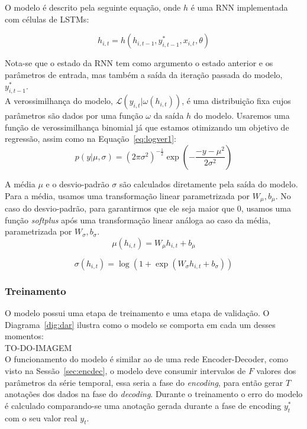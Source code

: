 O modelo é descrito pela seguinte equação, onde $h$ é uma RNN implementada com células de LSTMs:

\[
h_{i,t} = h(h_{i,t-1},y^*_{i,t-1},x_{i,t}, \theta)
\]

Nota-se que o estado da RNN tem como argumento o estado anterior e os parâmetros de entrada, mas também a saída da iteração passada do modelo, $y^*_{i,t-1}$. \\

A verossimilhança do modelo, $\mathcal{L}(y_{i,t} | \omega(h_{i,t}))$, é uma distribuição fixa cujos parâmetros são dados por uma função $\omega$ da saída $h$ do modelo. Usaremos uma função de verossimilhança binomial já que estamos otimizando um objetivo de regressão, assim como na Equação~\ref{eq:logver1}:
\[
  p(y | \mu,\sigma) = {(2\pi\sigma^2)}^{-\frac{1}{2}} \exp(-  \frac{-y - \mu^2}{2\sigma^2})  
\]

A média $\mu$ e o desvio-padrão $\sigma$ são calculados diretamente pela saída do modelo. Para a média, usamos uma transformação linear parametrizada por $W_{\mu},b_{\mu}$. No caso do desvio-padrão, para garantirmos que ele seja maior que 0, usamos uma função \textit{softplus} após uma transformação linear análoga ao caso da média, parametrizada por  $W_{\sigma},b_{\sigma}$.\\

\[ \mu(h_{i,t}) = W_{\mu}h_{i,t} + b_{\mu} \]

\[ \sigma(h_{i,t}) = \log(1 + \exp(W_{\sigma}h_{i,t}+ b_{\sigma})) \]


\subsubsection{Treinamento}



O modelo possui uma etapa de treinamento e uma etapa de validação. O Diagrama~\ref{dig:dar} ilustra como o modelo se comporta em cada um desses momentos: \\


TO-DO-IMAGEM \\


O funcionamento do modelo é similar ao de uma rede Encoder-Decoder, como visto na Sessão~\ref{sec:encdec}, o modelo deve consumir intervalos de $F$ valores dos parâmetros da série temporal, essa seria a fase do \textit{encoding}, para então gerar $T$ anotações dos dados na fase do \textit{decoding}. Durante o treinamento o erro do modelo é calculado comparando-se uma anotação gerada durante a fase de encoding $y^{*}_{t}$ com o seu valor real $y_{t}$. \\


